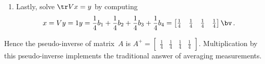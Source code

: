 \begin{example}
\begin{enumerate}
\item Lastly, solve \(\tr Vx=y\) by computing 
\begin{equation*}
x=Vy=1y=\h b_1+\h b_2+\h b_3+\h b_4
=\begin{bmatrix} \h&\h&\h&\h \end{bmatrix}\bv\,.
\end{equation*}
\end{enumerate}
\def\h{\frac14}%
Hence the pseudo-inverse of matrix~\(A\) is \(A^+=\begin{bmatrix}  \h&\h&\h&\h\end{bmatrix}\).
Multiplication by this pseudo-inverse implements the traditional answer of averaging measurements.
\end{example}






